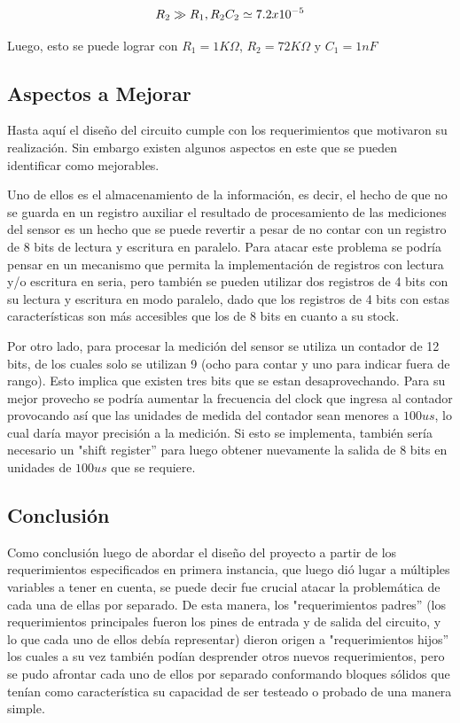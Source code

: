 \[
    R_{2}\gg R_{1},\\
    R_{2}C_{2}\simeq7.2x10^{-5}
\]

Luego, esto se puede lograr con $R_{1}=1K\varOmega$, $R_{2}=72K\varOmega$
y $C_{1}=1nF$

\subsection{Aspectos a Mejorar}

Hasta aquí el diseño del circuito cumple con los requerimientos que
motivaron su realización. Sin embargo existen algunos aspectos en
este que se pueden identificar como mejorables.

Uno de ellos es el almacenamiento de la información, es decir, el
hecho de que no se guarda en un registro auxiliar el resultado de
procesamiento de las mediciones del sensor es un hecho que se puede
revertir a pesar de no contar con un registro de 8 bits de lectura
y escritura en paralelo. Para atacar este problema se podría pensar
en un mecanismo que permita la implementación de registros con lectura
y/o escritura en seria, pero también se pueden utilizar dos registros
de 4 bits con su lectura y escritura en modo paralelo, dado que los
registros de 4 bits con estas características son más accesibles que
los de 8 bits en cuanto a su stock.

Por otro lado, para procesar la medición del sensor se utiliza un
contador de 12 bits, de los cuales solo se utilizan 9 (ocho para contar
y uno para indicar fuera de rango). Esto implica que existen tres
bits que se estan desaprovechando. Para su mejor provecho se podría
aumentar la frecuencia del clock que ingresa al contador provocando
así que las unidades de medida del contador sean menores a $100us$,
lo cual daría mayor precisión a la medición. Si esto se implementa,
también sería necesario un "shift register'' para luego obtener
nuevamente la salida de 8 bits en unidades de $100us$ que se requiere.

\subsection{Conclusión}

Como conclusión luego de abordar el diseño del proyecto a partir de
los requerimientos especificados en primera instancia, que luego dió
lugar a múltiples variables a tener en cuenta, se puede decir fue
crucial atacar la problemática de cada una de ellas por separado.
De esta manera, los "requerimientos padres'' (los requerimientos
principales fueron los pines de entrada y de salida del circuito,
y lo que cada uno de ellos debía representar) dieron origen a "requerimientos
hijos'' los cuales a su vez también podían desprender otros nuevos
requerimientos, pero se pudo afrontar cada uno de ellos por separado
conformando bloques sólidos que tenían como característica su capacidad
de ser testeado o probado de una manera simple.

